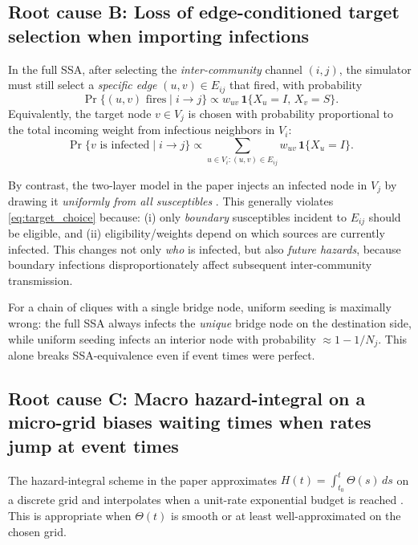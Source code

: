 \documentclass[11pt,a4paper]{article}
\begin{document}
\subsection{Root cause B: Loss of edge-conditioned target selection when importing infections}

In the full SSA, after selecting the \emph{inter-community} channel $(i,j)$, the simulator must still
select a \emph{specific edge} $(u,v)\in E_{ij}$ that fired, with probability
\begin{equation}
\label{eq:edge_choice}
\Pr\{(u,v)\text{ fires}\mid i\to j\} \propto
w_{uv}\,\mathbf{1}\{X_u=I,\,X_v=S\}.
\end{equation}
Equivalently, the target node $v\in V_j$ is chosen with probability proportional to the total incoming
weight from infectious neighbors in $V_i$:
\begin{equation}
\label{eq:target_choice}
\Pr\{v\text{ is infected}\mid i\to j\} \propto
\sum_{u\in V_i:(u,v)\in E_{ij}} w_{uv}\,\mathbf{1}\{X_u=I\}.
\end{equation}

By contrast, the two-layer model in the paper injects an infected node in $V_j$ by drawing it
\emph{uniformly from all susceptibles} \cite{paper}. This generally violates \eqref{eq:target_choice} because:
(i) only \emph{boundary} susceptibles incident to $E_{ij}$ should be eligible, and (ii) eligibility/weights depend on
which sources are currently infected. This changes not only \emph{who} is infected, but also \emph{future hazards},
because boundary infections disproportionately affect subsequent inter-community transmission.

For a chain of cliques with a single bridge node, uniform seeding is maximally wrong:
the full SSA always infects the \emph{unique} bridge node on the destination side, while uniform seeding infects an
interior node with probability $\approx 1-1/N_j$. This alone breaks SSA-equivalence even if event times were perfect.

\subsection{Root cause C: Macro hazard-integral on a micro-grid biases waiting times when rates jump at event times}

The hazard-integral scheme in the paper approximates
$H(t)=\int_{t_0}^t\Theta(s)\,ds$ on a discrete grid and interpolates when a unit-rate exponential budget is reached
\cite{paper}. This is appropriate when $\Theta(t)$ is smooth or at least well-approximated on the chosen grid.
\end{document}
